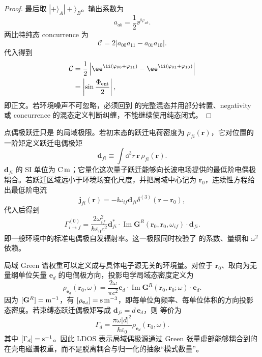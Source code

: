 \begin{proof}
最后取 $|+\rangle_A|+\rangle_B$。输出系数为
\[
a_{ab}=\frac12\ee^{\ii\varphi_{ab}}.
\]
两比特纯态 concurrence 为
\[
\mathcal C=2|a_{00}a_{11}-a_{01}a_{10}|.
\]
代入得到
\begin{align*}
\mathcal C
&=\frac12\left|
\ee^{\ii(\varphi_{00}+\varphi_{11})}
-\ee^{\ii(\varphi_{01}+\varphi_{10})}
\right|\\
&=\left|\sin\frac{\Phi_{\rm ent}}2\right|,
\end{align*}
即正文。若环境噪声不可忽略，必须回到 的完整混态并用部分转置、negativity 或 concurrence 的混态定义判断纠缠，不能继续使用纯态闭式。
\end{proof}


点偶极跃迁只是 的局域极限。若初末态的跃迁电荷密度为 $\rho_{fi}(\mathbf r)$，它对位置的一阶矩定义跃迁电偶极矩
\begin{equation*}
\mathbf d_{fi}
\equiv\int\dd^3 r\,\mathbf r\,\rho_{fi}(\mathbf r).
\end{equation*}
$\mathbf d_{fi}$ 的 SI 单位为 ${\rm C\,m}$；它量化这次量子跃迁能够向长波电场提供的最低阶电偶极耦合。若跃迁区域远小于环境场变化尺度，并把局域中心记为 $\mathbf r_0$，连续性方程给出最低阶电流
\[
\mathbf j_{fi}(\mathbf r)
=-\ii\omega_{if}\mathbf d_{fi}\delta^{(3)}(\mathbf r-\mathbf r_0),
\]
代入后得到
\begin{equation}
\boxed{
\Gamma_{i\to f}^{(0)}
=\frac{2\omega_{if}^2}{\hbar\varepsilon_0c^2}
\mathbf d_{fi}^{*}\cdot
\operatorname{Im}\mathbf G^R(\mathbf r_0,\mathbf r_0,\omega_{if})\cdot
\mathbf d_{fi}.}
\label{eq:dipole_green_decay_rate}
\end{equation}
即一般环境中的标准电偶极自发辐射率。这一极限同时校验了 的系数、量纲和 $\omega^2$ 依赖。

局域 Green 谱权重可以定义成与具体电子源无关的环境量。对位于 $\mathbf r_0$、取向为无量纲单位矢量 $\mathbf e_d$ 的电偶极方向，投影电学局域态密度定义为
\begin{equation}
\boxed{
\rho_{\mathbf e_d}(\mathbf r_0,\omega)
=\frac{2\omega}{\pi c^2}
\mathbf e_d\cdot
\operatorname{Im}\mathbf G^R(\mathbf r_0,\mathbf r_0;\omega)
\cdot\mathbf e_d.}
\label{eq:projected_electric_ldos_definition}
\end{equation}
因为 $[\mathbf G^R]={\rm m^{-1}}$，有 $[\rho_{\mathbf e_d}]={\rm s\,m^{-3}}$，即每单位角频率、每单位体积的方向投影态密度。若束缚态跃迁偶极矩写成 $\mathbf d_{fi}=d\,\mathbf e_d$，则 等价为
\begin{equation}
\boxed{
\Gamma_d
=\frac{\pi\omega|d|^2}{\hbar\varepsilon_0}
\rho_{\mathbf e_d}(\mathbf r_0,\omega).}
\label{eq:dipole_decay_projected_ldos}
\end{equation}
其中 $[\Gamma_d]={\rm s^{-1}}$。因此 LDOS 表示局域偶极源通过 Green 张量虚部能够耦合到的在壳电磁谱权重，而不是脱离耦合与归一化的抽象“模式数量”。


